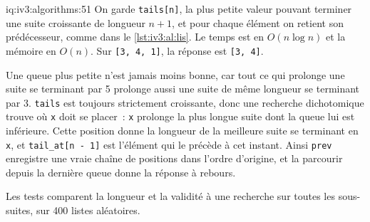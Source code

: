 \begin{solution}{iq:iv3:algorithms:51}
On garde \texttt{tails[n]}, la plus petite valeur pouvant terminer une suite croissante de longueur $n + 1$, et pour chaque élément on retient son prédécesseur, comme dans le \cref{lst:iv3:al:lis}. Le temps est en $O(n \log n)$ et la mémoire en $O(n)$. Sur \texttt{[3, 4, 1]}, la réponse est \texttt{[3, 4]}.
\label{lst:iv3:al:lis}

Une queue plus petite n'est jamais moins bonne, car tout ce qui prolonge une suite se terminant par 5 prolonge aussi une suite de même longueur se terminant par 3. \texttt{tails} est toujours strictement croissante, donc une recherche dichotomique trouve où \texttt{x} doit se placer~: \texttt{x} prolonge la plus longue suite dont la queue lui est inférieure. Cette position donne la longueur de la meilleure suite se terminant en \texttt{x}, et \texttt{tail\_at[n - 1]} est l'élément qui le précède à cet instant. Ainsi \texttt{prev} enregistre une vraie chaîne de positions dans l'ordre d'origine, et la parcourir depuis la dernière queue donne la réponse à rebours.

Les tests comparent la longueur et la validité à une recherche sur toutes les sous-suites, sur 400 listes aléatoires.

\end{solution}

